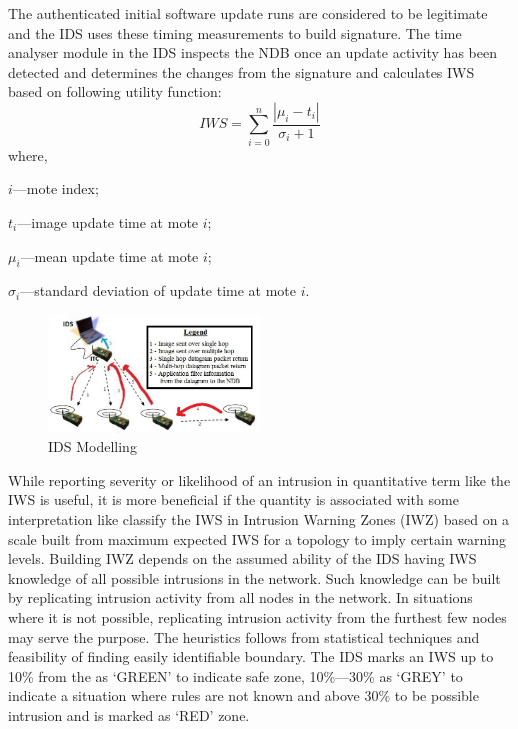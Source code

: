 \documentclass[conference]{IEEEtran}
\begin{document}
The authenticated initial software update runs are considered to be legitimate and the IDS uses these timing measurements to build signature.
The time analyser module in the IDS inspects the NDB once an update activity has been detected and determines the changes from the signature and calculates IWS based on following utility function:
\begin{equation}
\label{eqn2} 
	\mathit{IWS} = \sum \limits_{i=0}^{n} \frac{\left| \mu_i - t_i \right|}{\sigma_i + 1}
\end{equation}
where, 
\begin{inparaenum}
\item $\mathit{i}$---mote index;%
\item $\mathit{t_i}$---image update time at mote $\mathit{i}$;  
\item $\mathit{\mu_i}$---mean update time at mote $\mathit{i}$;  
\item $\mathit{\sigma_i}$---standard deviation of update time at mote $\mathit{i}$. 
\end{inparaenum}	
\begin{figure}[btp]
    \centering
    \includegraphics[width=0.5\textwidth]{IDS}
    \caption{IDS Modelling}
    \label{fig:ids_model}
\end{figure}
While reporting severity or likelihood of an intrusion in quantitative term like the IWS is useful, it is more beneficial if the quantity is associated with some interpretation like classify the IWS in Intrusion Warning Zones (IWZ) based on a scale built from maximum expected IWS for a topology to imply certain warning levels.
Building IWZ depends on the assumed ability of the IDS having IWS knowledge of all possible intrusions in the network.
Such knowledge can be built by replicating intrusion activity from all nodes in the network.
In situations where it is not possible, replicating intrusion activity from the furthest few nodes may serve the purpose.
The heuristics follows from statistical techniques and feasibility of finding easily identifiable boundary.
The IDS marks an IWS up to 10\% from the as `GREEN' to indicate safe zone,
10\%---30\% as `GREY' to indicate a situation where rules are not known and 
above 30\% to be possible intrusion and is marked as `RED' zone.
\end{document}
